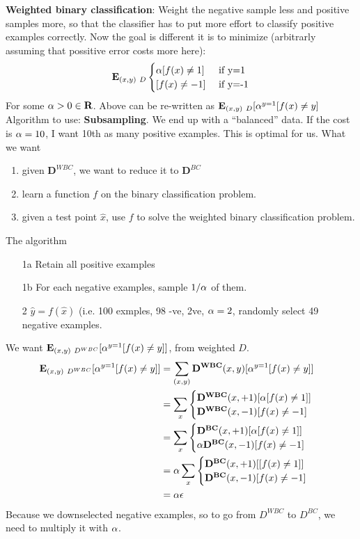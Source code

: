 \textbf{Weighted binary classification}: Weight the negative sample less and
positive samples more, so that the classifier has to put more effort
to classify positive examples correctly. Now the goal is different it
is to minimize (arbitrarly assuming that possitive error costs more here):
$$\mathbf{E}_{(x,y)~D}
\begin{cases}
  \alpha[f(x)\neq  1]& \text{ if y=1}\\
[f(x)\neq -1] &  \text{ if y=-1}\\
\end{cases}
$$
For some $\alpha > 0 \in \mathbf{R}$. Above can be re-written as
$\mathbf{E}_{(x,y)~D}[\alpha^{y=1}[f(x)\neq y]$
Algorithm to use: \textbf{Subsampling}. We end up with a ``balanced''
data. If the cost is $\alpha=10$, I want 10th as many positive
examples. This is optimal for us.
What we want
\begin{enumerate}
\item given $\mathbf{D}^{WBC}$, we want to reduce it to $\mathbf{D}^{BC}$
\item learn a function $f$ on the binary classification problem.
\item given a test point $\hat x$, use $f$ to solve the weighted
  binary classification problem.
\end{enumerate}
The algorithm
\begin{enumerate}
\item[1a] Retain all positive examples
\item[1b] For each negative examples, sample $1/\alpha$ of them.
\item[2]  $\hat y= f(\hat x)$ (i.e. 100 exmples, 98 -ve, 2ve, $\alpha=2$,
  randomly select 49 negative examples.
\end{enumerate}
We want $\mathbf{E}_{(x,y)~D^{WBC}}[\alpha^{y=1}[f(x)\neq y]]$, from
weighted $D$.
\begin{align*}
  \mathbf{E}_{(x,y)~D^{WBC}}[\alpha^{y=1}[f(x)\neq y]]&=
 \sum_{(x,y)}\mathbf{D^{WBC}}(x,y)[\alpha^{y=1}[f(x)\neq y]]\\
 &= \sum_x \begin{cases} \mathbf{D^{WBC}}(x, +1)[\alpha [f(x)\neq 1]]& \\
     \mathbf{D^{WBC}}(x, -1)[f(x)\neq -1]\end{cases}\\
 &= \sum_x \begin{cases} \mathbf{D^{BC}}(x, +1)[\alpha [f(x)\neq 1]]\\
     \alpha\mathbf{D^{BC}}(x, -1)[f(x)\neq -1]\end{cases}\\
 &= \alpha \sum_x\begin{cases} \mathbf{D^{BC}}(x, +1)[[f(x)\neq 1]]\\
     \mathbf{D^{BC}}(x, -1)[f(x)\neq -1]\end{cases}\\
&=\alpha \epsilon
\end{align*}
Because we downselected negative examples, so to go from $D^{WBC}$ to
$D^{BC}$, we need to multiply it with $\alpha$. 

